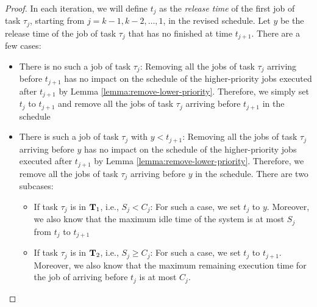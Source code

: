 \begin{proof}
In each iteration, we will define $t_j$ as the \emph{release time} of the first job of task $\tau_j$, starting from $j=k-1, k-2, \ldots, 1$, in the revised schedule. Let $y$ be the release time of the job of task $\tau_j$ that has no finished at time $t_{j+1}$. There are a few cases:
\begin{itemize}
\item There is no such a job of task $\tau_j$: Removing all the jobs of task $\tau_j$ arriving before $t_{j+1}$ has no impact on the schedule of the higher-priority jobs executed after $t_{j+1}$ by Lemma \ref{lemma:remove-lower-priority}. Therefore, we simply set $t_j$ to $t_{j+1}$ and remove all the jobs of task $\tau_j$ arriving before $t_{j+1}$ in the schedule
\item There is such a job of task $\tau_j$ with $y < t_{j+1}$:  Removing all the jobs of task $\tau_j$ arriving before $y$ has no impact on the schedule of the higher-priority jobs executed after $t_{j+1}$ by Lemma \ref{lemma:remove-lower-priority}. Therefore, we remove all the jobs of task $\tau_j$ arriving before $y$ in the schedule. There are two subcases:
\begin{itemize}
\item If task $\tau_j$ is in ${\bf T}_1$, i.e., $S_j < C_j$: For such a case, we set $t_{j}$ to $y$. Moreover, we also know that the maximum idle time of the system is at most $S_j$ from $t_j$ to $t_{j+1}$
\item If task $\tau_j$ is in ${\bf T}_2$, i.e., $S_j \geq C_j$: For such a case, we set $t_{j}$ to $t_{j+1}$. Moreover, we also know that the maximum remaining execution time for the job of arriving before $t_{j}$ is at most $C_j$.
\end{itemize}
\end{itemize}
 
\end{proof}
  
  

  
  
  
  
  
  
  
  
  
  
  
  
  
  
  
  
  
  
  